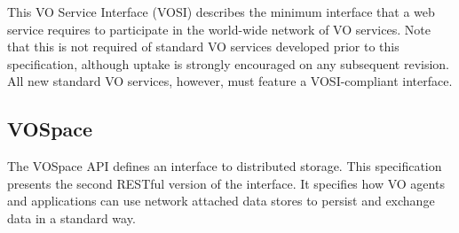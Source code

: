 \documentclass[11pt,a4paper]{ivoa}
\begin{document}
This VO Service Interface (VOSI) \citep{2017ivoa.spec.0524G} describes the minimum interface that a web service requires to 
participate in the world-wide network of VO services. Note that this is not required of 
standard VO services developed prior to this specification, although uptake is strongly 
encouraged on any subsequent revision. All new standard VO services, however, must feature 
a VOSI-compliant interface. 

\subsection{VOSpace}

The VOSpace \citep{2018ivoa.spec.0621G} API defines an interface to distributed storage. This specification presents the 
second RESTful version of the interface. It specifies how VO agents and applications can 
use network attached data stores to persist and exchange data in a standard way. 


\end{document}
